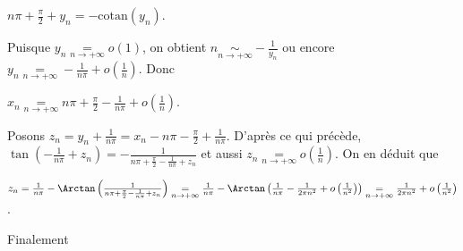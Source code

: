 {{\begin{center}
$n\pi+ \frac{\pi}{2}+y_n = -\mathrm{cotan}(y_n)$.
\end{center}

Puisque $y_n\underset{n\rightarrow+\infty}{=}o(1)$, on obtient $n\underset{n\rightarrow+\infty}{\sim}- \frac{1}{y_n}$  ou encore $y_n\underset{n\rightarrow+\infty}{=} - \frac{1}{n\pi}+o\left( \frac{1}{n}\right)$. Donc

\begin{center}
$x_n\underset{n\rightarrow+\infty}{=} n\pi+ \frac{\pi}{2}- \frac{1}{n\pi}+o\left( \frac{1}{n}\right)$.
\end{center}

Posons $z_n = y_n+ \frac{1}{n\pi}= x_n-n\pi- \frac{\pi}{2}+ \frac{1}{n\pi}$. D'après ce qui précède, $\tan\left(- \frac{1}{n\pi}+z_n\right)=- \frac{1}{n\pi+ \frac{\pi}{2}- \frac{1}{n\pi}+z_n}$ et aussi $z_n\underset{n\rightarrow+\infty}{=}o\left( \frac{1}{n}\right)$. On en déduit que

\begin{center}
$z_n= \frac{1}{n\pi}-\Arctan\left( \frac{1}{n\pi+ \frac{\pi}{2}- \frac{1}{n\pi}+z_n}\right)\underset{n\rightarrow+\infty}{=} \frac{1}{n\pi}-\Arctan\left( \frac{1}{n\pi}- \frac{1}{2\pi n^2}+o\left( \frac{1}{n^2}\right)\right)\underset{n\rightarrow+\infty}{=} \frac{1}{2\pi n^2}+o\left( \frac{1}{n^2}\right)$.
\end{center}

Finalement

\begin{center}
\end{center}
}
}
